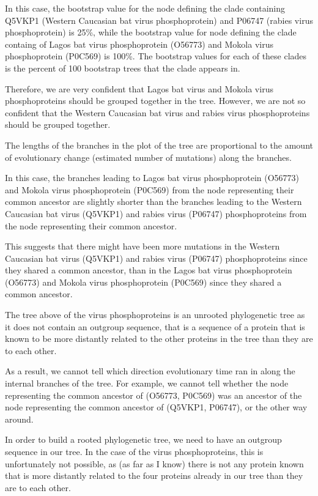 \documentclass[
]{book}
\begin{document}
In this case, the bootstrap value for the node defining the clade containing Q5VKP1 (Western Caucasian bat virus phosphoprotein) and P06747 (rabies virus phosphoprotein) is 25\%, while the bootstrap value for node defining the clade containg of Lagos bat virus phosphoprotein (O56773) and Mokola virus phosphoprotein (P0C569) is 100\%. The bootstrap values for each of these clades is the percent of 100 bootstrap trees that the clade appears in.

Therefore, we are very confident that Lagos bat virus and Mokola virus phosphoproteins should be grouped together in the tree. However, we are not so confident that the Western Caucasian bat virus and rabies virus phosphoproteins should be grouped together.

The lengths of the branches in the plot of the tree are proportional to the amount of evolutionary change (estimated number of mutations) along the branches.

In this case, the branches leading to Lagos bat virus phosphoprotein (O56773) and Mokola virus phosphoprotein (P0C569) from the node representing their common ancestor are slightly shorter than the branches leading to the Western Caucasian bat virus (Q5VKP1) and rabies virus (P06747) phosphoproteins from the node representing their common ancestor.

This suggests that there might have been more mutations in the Western Caucasian bat virus (Q5VKP1) and rabies virus (P06747) phosphoproteins since they shared a common ancestor, than in the Lagos bat virus phosphoprotein (O56773) and Mokola virus phosphoprotein (P0C569) since they shared a common ancestor.

The tree above of the virus phosphoproteins is an unrooted phylogenetic tree as it does not contain an outgroup sequence, that is a sequence of a protein that is known to be more distantly related to the other proteins in the tree than they are to each other.

As a result, we cannot tell which direction evolutionary time ran in along the internal branches of the tree. For example, we cannot tell whether the node representing the common ancestor of (O56773, P0C569) was an ancestor of the node representing the common ancestor of (Q5VKP1, P06747), or the other way around.

In order to build a rooted phylogenetic tree, we need to have an outgroup sequence in our tree. In the case of the virus phosphoproteins, this is unfortunately not possible, as (as far as I know) there is not any protein known that is more distantly related to the four proteins already in our tree than they are to each other.
\end{document}
